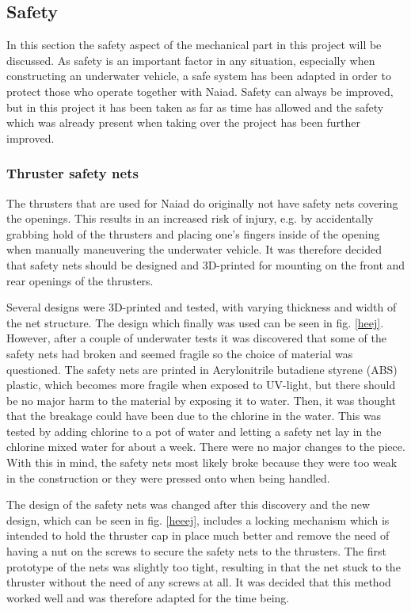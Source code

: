 \subsection{Safety} %
\noindent In this section the safety aspect of the mechanical part in this project will be discussed. As safety is an important factor in any situation, especially when constructing an underwater vehicle, a safe system has been adapted in order to protect those who operate together with Naiad. Safety can always be improved, but in this project it has been taken as far as time has allowed and the safety which was already present when taking over the project has been further improved. 

	\subsubsection{Thruster safety nets}
\noindent The thrusters that are used for Naiad do originally not have safety nets covering the openings. This results in an increased risk of injury, e.g. by accidentally grabbing hold of the thrusters and placing one's fingers inside of the opening when manually maneuvering the underwater vehicle. It was therefore decided that safety nets should be designed and 3D-printed for mounting on the front and rear openings of the thrusters. 

Several designs were 3D-printed and tested, with varying thickness and width of the net structure. The design which finally was used can be seen in fig. \ref{heej}. However, after a couple of underwater tests it was discovered that some of the safety nets had broken and seemed fragile so the choice of material was questioned. The safety nets are printed in Acrylonitrile butadiene styrene (ABS) plastic, which becomes more fragile when exposed to UV-light, but there should be no major harm to the material by exposing it to water. Then, it was thought that the breakage could have been due to the chlorine in the water. This was tested by adding chlorine to a pot of water and letting a safety net lay in the chlorine mixed water for about a week. There were no major changes to the piece. With this in mind, the safety nets most likely broke because they were too weak in the construction or they were pressed onto when being handled.

The design of the safety nets was changed after this discovery and the new design, which can be seen in fig. \ref{heeej}, includes a locking mechanism which is intended to hold the thruster cap in place much better and remove the need of having a nut on the screws to secure the safety nets to the thrusters. The first prototype of the nets was slightly too tight, resulting in that the net stuck to the thruster without the need of any screws at all. It was decided that this method worked well and was therefore adapted for the time being.  

